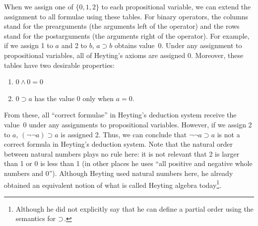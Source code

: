 When we assign one of $\{0,1,2\}$ to each propositional variable, we
can extend the assignment to all formulae using these tables.
For binary operators, the columns stand for the prearguments (the
arguments left of the operator) and the
rows stand for the postarguments (the arguments right of the operator).
For example, if we assign 1 to $a$ and 2 to $b$,
$a\supset b$ obtains value~0.
Under any assignment to propositional variables, all of Heyting's axioms
are assigned 0.  Moreover, these tables have two desirable properties:
\begin{enumerate}
 \item $0\land 0 = 0$
 \item $0\supset a$ has the value 0 only when $a = 0$.
\end{enumerate}
From these, all ``correct formulae'' in Heyting's deduction system
receive the value~0 under any assignments to propositional variables.
However, if we assign 2 to $a$, $(\neg \neg a)\supset a$
is assigned 2.  Thus, we can conclude that $\neg \neg a \supset a$ is
not a correct formula in Heyting's deduction system.
Note that the natural order between natural numbers
plays no rule here: it is not relevant that 2 is larger than 1 or 0 is
less than 1 (in other places he uses ``all positive and negative
whole numbers and 0'').  Although Heyting used natural numbers here, he
already obtained an equivalent notion of what is called Heyting algebra
today\footnote{Although he did not explicitly say that he can define a
partial order using the semantics for $\supset$.}.

